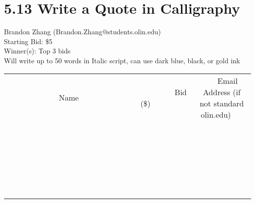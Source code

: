 \documentclass[11pt]{article}
\begin{document}
\section*{5.13 Write a Quote in Calligraphy}
Brandon Zhang (Brandon.Zhang@students.olin.edu) \\
Starting Bid: \$5 \\
Winner(s): 
Top 3 bids \\
Will write up to 50 words in Italic script, can use dark blue, black, or gold ink \\[6ex]
\begin{tabular}{c c c}
~~~~~~~~~~~~~Name~~~~~~~~~~~~~ & ~~~~~~~~~Bid (\$)~~~~~~~~~ & ~~~Email Address (if not standard olin.edu)~~~ \\
 & & \\
\hline
 & & \\
\hline
 & & \\
\hline
 & & \\
\hline
 & & \\
\hline
 & & \\
\hline
 & & \\
\hline
 & & \\
\hline
 & & \\
\hline
 & & \\
\hline
 & & \\
\hline
 & & \\
\hline
 & & \\
\hline
 & & \\
\hline
 & & \\
\hline
 & & \\
\hline
 & & \\
\hline
 & & \\
\hline
 & & \\
\hline
 & & \\
\hline
 & & \\
\hline
 & & \\
\hline
 & & \\
\hline
 & & \\
\hline
 & & \\
\hline
 & & \\
\hline
\end{tabular}
\clearpage
\end{document}
